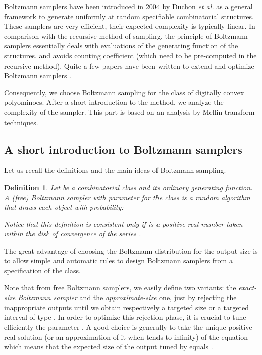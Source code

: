 \documentclass{article}
\newtheorem{definition}[theorem]{Definition}
\begin{document}
Boltzmann samplers have been introduced in 2004 by Duchon \textit{et
  al.} \cite{DuFlLoSc04} as a general framework to generate uniformly at random
specifiable combinatorial structures. These samplers are very
efficient, their expected complexity is typically linear. In comparison with the recursive method of sampling, the
principle of Boltzmann samplers essentially deals with evaluations
of the generating function of the structures, and avoids counting coefficient (which need to be pre-computed in the recursive
method). Quite a few papers have been written to extend and
optimize Boltzmann samplers
\cite{PiSaSo08,BoJa08,BoRoSo,BoPo10,BoFuKaVi,BoGaRo10,BoLu12}.

Consequently, we choose Boltzmann sampling for the class of digitally
convex polyominoes. After a short introduction to the method, we
analyze the complexity of the sampler. This part is based on an
analysis by Mellin transform techniques.


\subsection{A short introduction to Boltzmann samplers}
Let us recall the definitions and the main ideas of Boltzmann sampling.
\begin{definition}
Let  be a combinatorial class and  its ordinary
generating function. A \emph{(free) Boltzmann sampler} with
parameter  for the class  is a random algorithm
 that draws each object  with
probability:

Notice that this definition is consistent only if  is a
positive real number taken within the disk of convergence of the
series .
\end{definition}

The great advantage of choosing the Boltzmann distribution for the
output size is to allow simple and automatic rules to design Boltzmann
samplers from a specification of the class. 


Note that from free Boltzmann samplers, we easily define two
variants: the \emph{exact-size Boltzmann sampler} and the
\emph{approximate-size} one, just by rejecting the inappropriate
outputs until we obtain respectively a targeted size or a targeted
interval of type . In order to optimize
this rejection phase, it is crucial to tune efficiently the
parameter . A good choice is generally to take the unique
positive real solution  (or an approximation of it when 
tends to infinity) of the equation  which
means that the expected size of the output tuned by 
equals .
\end{document}
